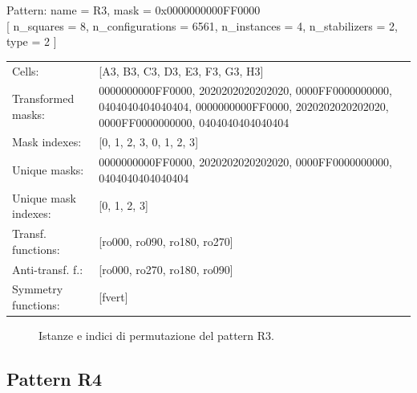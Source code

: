 \begin{tcolorbox}[sharp corners, fontupper=\ttfamily\small, colback=white]
  \noindent Pattern: name = R3, mask = 0x0000000000FF0000\\
  {[} n\_squares = 8, n\_configurations = 6561,
  n\_instances = 4, n\_stabilizers = 2, type = 2 { ]}\\[1.0ex]
  \begin{tabularx}{\textwidth}{@{} p{3.5cm} X @{}}
    Cells:               & {[}A3, B3, C3, D3, E3, F3, G3, H3{]}\\[0.5ex]
    Transformed masks:   & 0000000000FF0000, 2020202020202020, 0000FF0000000000, 0404040404040404, 0000000000FF0000, 2020202020202020, 0000FF0000000000, 0404040404040404\\[0.5ex]
    Mask indexes:        & {[}0, 1, 2, 3, 0, 1, 2, 3{]}\\[0.5ex]
    Unique masks:        & 0000000000FF0000, 2020202020202020, 0000FF0000000000, 0404040404040404\\[0.5ex]
    Unique mask indexes: & {[}0, 1, 2, 3{]}\\[0.5ex]
    Transf. functions:   & {[}ro000, ro090, ro180, ro270{]}\\[0.5ex]
    Anti-transf. f.:     & {[}ro000, ro270, ro180, ro090{]}\\[0.5ex]
    Symmetry functions:  & {[}fvert{]}\\[0.5ex]
  \end{tabularx}
\end{tcolorbox}

\begin{figure}[htbp]
  \centering
   \hfill
   \hfill
   \hfill
  \vspace{0.3cm}
   \hfill
   \hfill
   \hfill
  \caption{Istanze e indici di permutazione del pattern R3.}
\end{figure}

\newpage

\subsection{Pattern R4}

